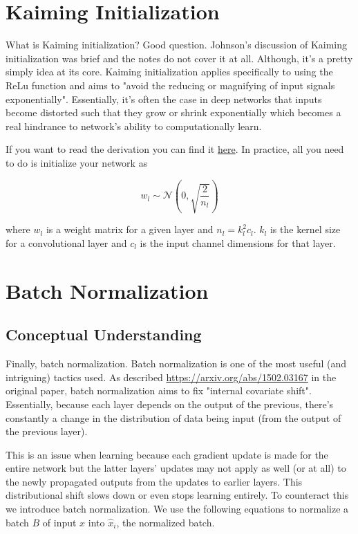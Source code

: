 \documentclass[12pt]{article}
\begin{document}
\section{Kaiming Initialization}
What is Kaiming initialization? Good question. Johnson's discussion of Kaiming initialization was 
brief and the notes do not cover it at all. Although, it's a pretty simply idea at its core. 
Kaiming initialization applies specifically to using the ReLu function and aims to "avoid the 
reducing or magnifying of input signals exponentially". Essentially, it's often the case 
in deep networks that inputs become distorted such that they grow or shrink exponentially 
which becomes a real hindrance to network's ability to computationally learn. 

If you want to read the derivation you can find it \href{https://arxiv.org/abs/1502.01852v1}{here}. 
In practice, all you need to do is initialize your network as

\begin{equation*}
    w_l \sim \mathcal{N}(0, \sqrt{ \frac{2}{n_l} })
\end{equation*}

\noindent where $w_l$ is a weight matrix for a given layer and $n_l = k_l^2 c_l$. $k_l$ is the kernel 
size for a convolutional layer and $c_l$ is the input channel dimensions for that layer. 


\section{Batch Normalization}

\subsection{Conceptual Understanding}
Finally, batch normalization. Batch normalization is one of the most useful (and
intriguing) tactics used. As described \href{here}{https://arxiv.org/abs/1502.03167}
in the original paper, batch normalization aims to fix "internal covariate shift". 
Essentially, because each layer depends on the output of the previous, there's constantly 
a change in the distribution of data being input (from the output of the previous layer). 

This is an issue when learning because each gradient update is made for the entire 
network but the latter layers' updates may not apply as well (or at all) to the newly 
propagated outputs from the updates to earlier layers. This distributional shift 
slows down or even stops learning entirely. To counteract this we introduce batch normalization. 
We use the following equations to normalize a batch $B$ of input $x$ into $\hat{x}_i$, 
the normalized batch. 
\end{document}
